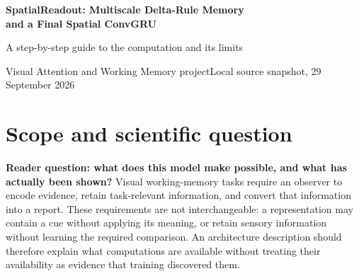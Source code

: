 \documentclass[10pt,letterpaper]{article}
\begin{document}
\thispagestyle{empty}
{\color{ink}\LARGE\bfseries SpatialReadout: Multiscale Delta-Rule Memory\\[3pt] and a Final Spatial ConvGRU\par}
\vspace{8pt}
{\large A step-by-step guide to the computation and its limits}\par
\vspace{4pt}
{\small Visual Attention and Working Memory project\quad\textbullet\quad Local source snapshot, 29 September 2026}
\vspace{8pt}
\begin{abstract}
\noindent This paper specifies the current \texttt{SpatialReadout} model, rather than its historical global-GRU predecessor or an isolated KDA module. Centered, three-frame RGB stacks pass through four convolutional blocks. Three spatial Kimi Delta Attention (KDA) accumulators, interleaved at $25\times25$, $13\times13$, and $7\times7$, contribute local associative memory to the feedforward hierarchy. The deepest $160\times7\times7$ field is projected to 64 channels and integrated by a final convolutional gated recurrent unit (ConvGRU). Only its terminal $64\times7\times7$ state is flattened and projected to 256 features for a task-specific linear head. An independent CPU constructor audit gives \textbf{1,383,028 trainable parameters}. We derive the exact decay--correction--read update, its signed temporal coefficients, and the implemented write/reset convention. The principal design decision is to postpone \emph{global} compression until after final recurrence, while retaining spatially organized encoder memory. This supplies an inductive bias, not proof of better retention, comparison learning, or biological equivalence. We distinguish documented design intent from plausible but untested explanations, and separate the current fresh-origin training lineage from an earlier warm-start branch. No training, trained-model inference, or new behavioral experiment was performed for this paper.
\end{abstract}
\section{Scope and scientific question}
\textbf{Reader question: what does this model make possible, and what has actually been shown?}
Visual working-memory tasks require an observer to encode evidence, retain task-relevant information, and convert that information into a report. These requirements are not interchangeable: a representation may contain a cue without applying its meaning, or retain sensory information without learning the required comparison. An architecture description should therefore explain what computations are available without treating their availability as evidence that training discovered them.
\end{document}
